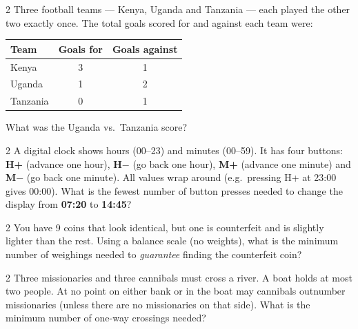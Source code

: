 \begin{problem}{2}
Three football teams --- Kenya, Uganda and Tanzania --- each played
the other two exactly once. The total goals scored for and against
each team were:

\smallskip
\begin{center}
\begin{tabular}{lcc}
\toprule
Team & Goals for & Goals against \\ \midrule
Kenya    & 3 & 1 \\
Uganda   & 1 & 2 \\
Tanzania & 0 & 1 \\ \bottomrule
\end{tabular}
\end{center}

\smallskip
What was the Uganda vs.\ Tanzania score?
\end{problem}

\begin{problem}{2}
A digital clock shows hours (00--23) and minutes (00--59).
It has four buttons: \textbf{H+} (advance one hour), \textbf{H$-$}
(go back one hour), \textbf{M+} (advance one minute) and \textbf{M$-$}
(go back one minute). All values wrap around (e.g.\ pressing H+ at 23:00
gives 00:00). What is the fewest number of button presses needed to change
the display from \textbf{07:20} to \textbf{14:45}?
\end{problem}

\begin{problem}{2}
You have 9 coins that look identical, but one is counterfeit and is
slightly lighter than the rest. Using a balance scale (no weights),
what is the minimum number of weighings needed to \emph{guarantee}
finding the counterfeit coin?
\end{problem}

\begin{problem}{2}
Three missionaries and three cannibals must cross a river.
A boat holds at most two people. At no point on either bank or in the
boat may cannibals outnumber missionaries (unless there are no
missionaries on that side).
What is the minimum number of one-way crossings needed?
\end{problem}

